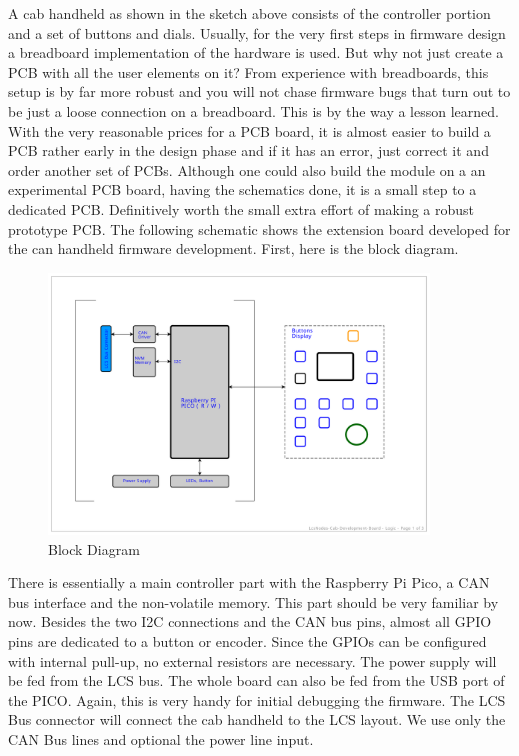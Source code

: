 A cab handheld as shown in the sketch above consists of the controller portion and a set of buttons and dials. Usually, for the very first steps in firmware design a breadboard implementation of the hardware is used. But why not just create a PCB with all the user elements on it? From experience with breadboards, this setup is by far more robust and you will not chase firmware bugs that turn out to be just a loose connection on a breadboard. This is by the way a lesson learned. With the very reasonable prices for a PCB board, it is almost easier to build a PCB rather early in the design phase and if it has an error, just correct it and order another set of PCBs. Although one could also build the module on a an experimental PCB board, having the schematics done, it is a small step to a dedicated PCB. Definitively worth the small extra effort of making a robust prototype PCB. The following schematic shows the extension board developed for the can handheld firmware development. First, here is the block diagram.

\begin{figure}[ht]
    \centering
    \includegraphics[page=1, width=0.9\textwidth]{./Schematics/Schematic_LcsNodes-Cab-Dev.pdf}
    \caption{Block Diagram}
\end{figure}

There is essentially a main controller part with the Raspberry Pi Pico, a CAN bus interface and the non-volatile memory. This part should be very familiar by now. Besides the two I2C connections and the CAN bus pins, almost all GPIO pins are dedicated to a button or encoder. Since the GPIOs can be configured with internal pull-up, no external resistors are necessary. The power supply will be fed from the LCS bus. The whole board can also be fed from the USB port of the PICO. Again, this is very handy for initial debugging the firmware. The LCS Bus connector will connect the cab handheld to the LCS layout. We use only the CAN Bus lines and optional the power line input.

